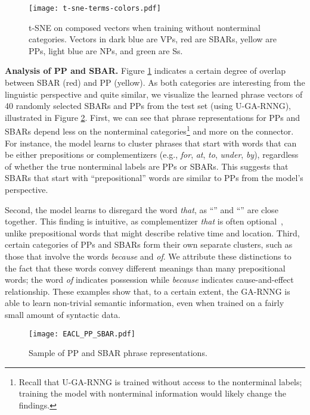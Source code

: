 \documentclass[11pt]{article}
\begin{document}
\begin{figure}[h]
\centering
\texttt{[image: t-sne-terms-colors.pdf]}
\caption{t-SNE on composed vectors when training without nonterminal categories. Vectors in dark blue are VPs, red are SBARs, yellow are PPs, light blue are NPs, and green are Ss. 
\label{fig:nt-cluster}}
\end{figure}

\textbf{Analysis of PP and SBAR.} Figure \ref{fig:nt-cluster} indicates a certain degree of overlap between SBAR (red) and PP (yellow). As both categories are interesting from the linguistic perspective and quite similar, we visualize the learned phrase vectors of 40 randomly selected SBARs and PPs from the test set (using U-GA-RNNG), illustrated in Figure \ref{fig:pp-sbar}. First, we can see that phrase representations for PPs and SBARs depend less on the nonterminal categories\footnote{Recall that U-GA-RNNG is trained without access to the nonterminal labels; training the model with nonterminal information would likely change the findings.} and more on the connector. For instance, the model learns to cluster phrases that start with words that can be either prepositions or complementizers (e.g., \emph{for}, \emph{at}, \emph{to}, \emph{under}, \emph{by}), regardless of whether the true nonterminal labels are PPs or SBARs. This suggests that SBARs that start with ``prepositional'' words are similar to PPs from the model's perspective.

Second, the model learns to disregard the word \emph{that}, as ``'' and ``'' are close together. This finding is intuitive, as complementizer \emph{that} is often optional~\cite{jaeger:2010}, unlike prepositional words that might describe relative time and location. Third, certain categories of PPs and SBARs form their own separate clusters, such as those that involve the words \emph{because} and \emph{of}. We attribute these distinctions to the fact that these words convey different meanings than many prepositional words; the word \emph{of} indicates possession while \emph{because} indicates cause-and-effect relationship. These examples show that, to a certain extent, the GA-RNNG is able to learn non-trivial semantic information, even when trained on a fairly small amount of syntactic data.

\begin{figure}[h]
\texttt{[image: EACL\_PP\_SBAR.pdf]}
\caption{Sample of PP and SBAR phrase representations.
\label{fig:pp-sbar}}
\end{figure}
\end{document}
